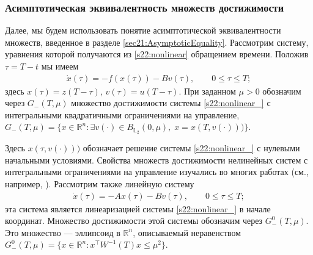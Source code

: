 \documentclass[../main.tex]{subfiles}
\begin{document}
\subsubsection{Асимптотическая эквивалентность множеств достижимости}

Далее, мы будем использовать понятие асимптотической эквивалентности множеств, введенное в разделе \ref{sec21:AsymptoticEquality}. 
Рассмотрим систему, уравнения которой получаются из \eqref{s22:nonlinear} обращением времени. 
Положив $\tau=T-t$ мы имеем
\begin{gather}\label{s22:nonlinear_}
 \dot{x}(\tau)=-f(x(\tau))-B v(\tau),\qquad 0 \leqslant \tau \leqslant T; 
\end{gather}
здесь $x(\tau)=z(T-\tau)$, $v(\tau)=u(T-\tau)$.
При заданном $\mu>0$ обозначим через $ G_{-} (T,\mu)$ множество достижимости системы \eqref{s22:nonlinear_} с интегральными квадратичными ограничениями на управление, $G_{-}(T,\mu)=\{x\in \mathbb{R}^n:\exists v(\cdot)\in B_{\mathbb{L}_2}(0,\mu),\; x=x( T,v(\cdot)))\}$.
 
Здесь $x( \tau,v(\cdot)))$ обозначает решение системы \eqref{s22:nonlinear_} с нулевыми начальными условиями. 
Свойства множеств достижимости нелинейных систем с интегральными ограничениями на управление изучались во многих работах (см., например, \cite{Guseinov2010,Rousse,GusZykIFAC}).
Рассмотрим также линейную систему 
\begin{gather}\label{s22:linear_}
 \dot{x}(\tau)=-Ax(\tau)-B v(\tau),\qquad 0 \leqslant \tau \leqslant T; 
\end{gather}
эта система является линеаризацией системы \eqref{s22:nonlinear_} в начале координат. 
Множество достижимости этой системы обозначим через $G_{-}^0(T,\mu)$. 
Это множество --- эллипсоид в $\mathbb{R}^n$, описываемый неравенством $G_{-}^0(T,\mu)=\{x \in \mathbb{R}^n: x^\top W^{-1}(T)x\leqslant \mu^2\}$. 

\end{document}
